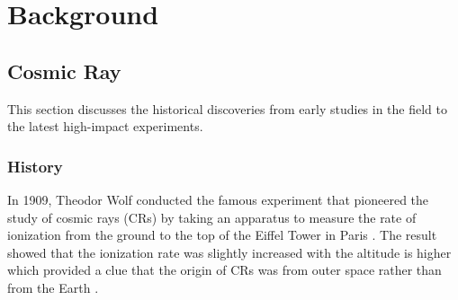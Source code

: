 \chapter{Background}


\section{Cosmic Ray}
This section discusses the historical discoveries from early
studies in the field to the latest high-impact experiments. 

\subsection{History}
In 1909, Theodor Wolf conducted the famous experiment that
pioneered the study of cosmic rays (CRs) by taking an apparatus
to measure the rate of ionization from the ground to the top of
the Eiffel Tower in Paris \citep{gray1949cosmic}.
The result showed that the ionization rate was slightly increased
with the altitude is higher which provided a clue
that the origin of CRs was from outer space
rather than from the Earth \citep{EarlyCRGerman}.


